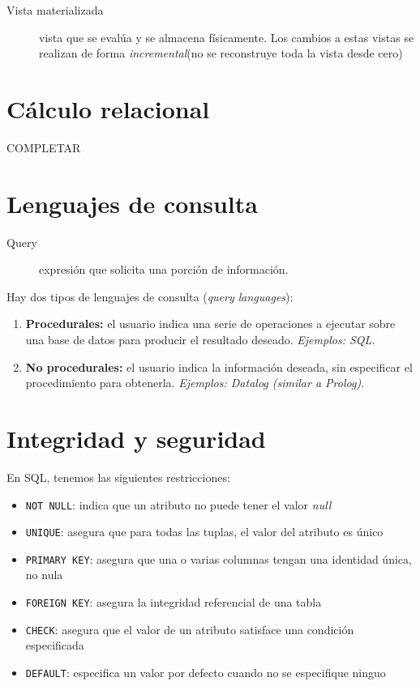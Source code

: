 \documentclass[a4paper, twoside]{article}
\begin{document}
\begin{description}
	\item[Vista materializada] vista que se evalúa y se almacena físicamente. Los cambios a estas vistas se realizan de forma \emph{incremental}(no se reconstruye toda la vista desde cero)
\end{description}

\section{Cálculo relacional}
COMPLETAR

\section{Lenguajes de consulta}
\begin{description}
	\item[Query] expresión que solicita una porción de información.
\end{description}

Hay dos tipos de lenguajes de consulta (\emph{query languages}):
\begin{enumerate}
	\item \textbf{Procedurales:} el usuario indica una serie de operaciones a ejecutar sobre una base de datos para producir el resultado deseado. \emph{Ejemplos: SQL.}
	\item \textbf{No procedurales:} el usuario indica la información deseada, sin especificar el procedimiento para obtenerla. \emph{Ejemplos: Datalog (similar a Prolog).}
\end{enumerate}

\section{Integridad y seguridad}
En SQL, tenemos las siguientes restricciones:
\begin{itemize}
	\item \texttt{NOT NULL}: indica que un atributo no puede tener el valor \emph{null}
	\item \texttt{UNIQUE}: asegura que para todas las tuplas, el valor del atributo es único
	\item \texttt{PRIMARY KEY}: asegura que una o varias columnas tengan una identidad única, no nula
	\item \texttt{FOREIGN KEY}: asegura la integridad referencial de una tabla
	\item \texttt{CHECK}: asegura que el valor de un atributo satisface una condición especificada
	\item \texttt{DEFAULT}: especifica un valor por defecto cuando no se especifique ninguo
\end{itemize}
\end{document}

